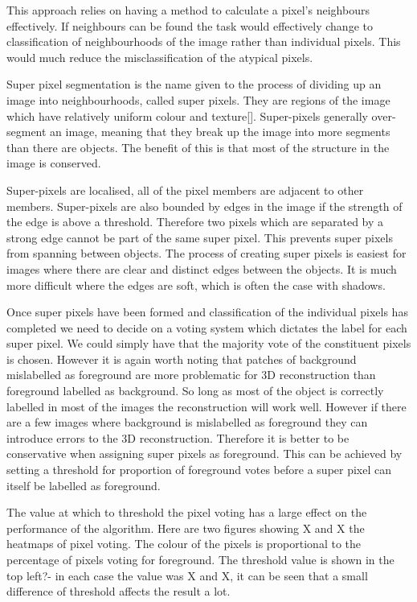 \documentclass[12pt]{IIBproject}
\begin{document}
This approach relies on having a method to calculate a pixel's neighbours effectively. If neighbours can be found the task would effectively change to classification of neighbourhoods of the image rather than individual pixels. This would much reduce the misclassification of the atypical pixels.

Super pixel segmentation is the name given to the process of dividing up an image into neighbourhoods, called super pixels. They are regions of the image which have relatively uniform colour and texture[]. Super-pixels generally over-segment an image, meaning that they break up the image into more segments than there are objects. The benefit of this is that most of the structure in the image is conserved.  

Super-pixels are localised, all of the pixel members are adjacent to other members. Super-pixels are also bounded by edges in the image if the strength of the edge is above a threshold. Therefore two pixels which are separated by a strong edge cannot be part of the same super pixel. This prevents super pixels from spanning between objects. The process of creating super pixels is easiest for images where there are clear and distinct edges between the objects. It is much more difficult where the edges are soft, which is often the case with shadows. 

Once super pixels have been formed and classification of the individual pixels has completed we need to decide on a voting system which dictates the label for each super pixel. We could simply have that the majority vote of the constituent pixels is chosen. However it is again worth noting that patches of background mislabelled as foreground are more problematic for 3D reconstruction than foreground labelled as background. So long as most of the object is correctly labelled in most of the images the reconstruction will work well. However if there are a few images where background is mislabelled as foreground they can introduce errors to the 3D reconstruction. Therefore it is better to be conservative when assigning super pixels as foreground. This can be achieved by setting a threshold for proportion of foreground votes before a super pixel can itself be labelled as foreground.

The value at which to threshold the pixel voting has a large effect on the performance of the algorithm. Here are two figures showing X and X the heatmaps of pixel voting. The colour of the pixels is proportional to the percentage of pixels voting for foreground. The threshold value is shown in the top left?- in each case the value was X and X, it can be seen that a small difference of threshold affects the result a lot. 
\end{document}
